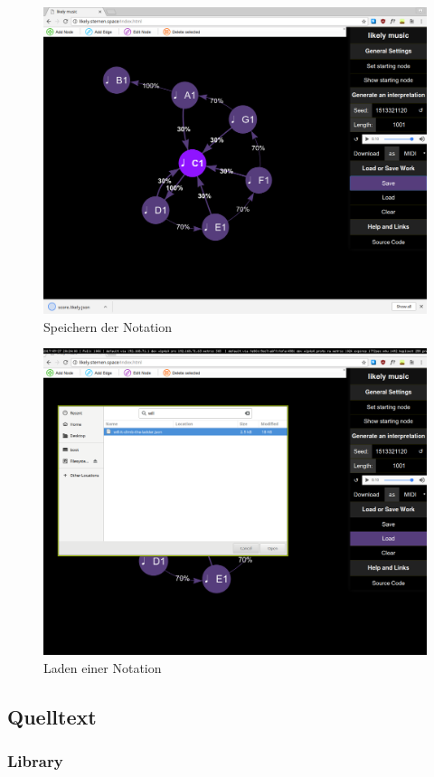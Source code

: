 \documentclass[a4paper,twocolumn]{article}
\begin{document}
\begin{figure}[H]
  \begin{center}
  \includegraphics[width=.8\textwidth]{screenshots/save.png}
  \end{center}
  \caption{Speichern der Notation}
\end{figure}

\begin{figure}[H]
  \begin{center}
  \includegraphics[width=.8\textwidth]{screenshots/load.png}
  \end{center}
  \caption{Laden einer Notation}
\end{figure}

\clearpage

\subsection*{Quelltext}
\subsubsection*{Library}
\label{sec:library}

\clearpage
\end{document}
